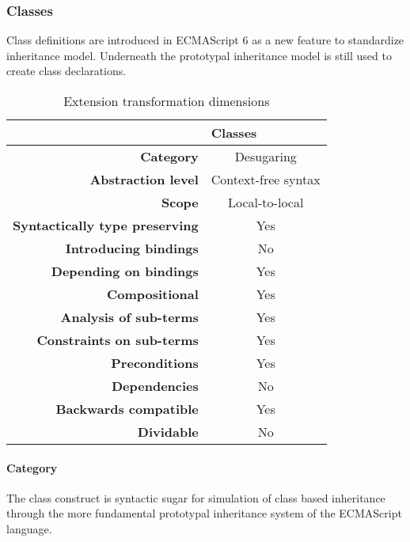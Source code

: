 \subsubsection{Classes}
Class definitions\cite[14.5]{SpecJS} are introduced in ECMAScript 6 as a new feature to standardize inheritance model. Underneath the prototypal inheritance model is still used to create class declarations.
\begin{table}[h]
\centering
\caption{Extension transformation dimensions}
\label{classes-table}
\begin{tabular}{@{}rc@{}}
\toprule
                                       & \multicolumn{1}{l}{\textbf{Classes}} \\ \midrule
\textbf{Category}                      & Desugaring
\\ 
\textbf{Abstraction level}          & Context-free syntax                          \\
\textbf{Scope}                         & Local-to-local                               \\
\textbf{Syntactically type preserving} & Yes                                          \\
\textbf{Introducing bindings}          & No                                          \\%
\textbf{Depending on bindings}         & Yes                                           \\
\textbf{Compositional}                 & Yes                                          \\
\textbf{Analysis of sub-terms}          & Yes                                          \\
\textbf{Constraints on sub-terms}       & Yes                                           \\
\textbf{Preconditions}                 & Yes                                          \\
\textbf{Dependencies}                  & No                                           \\
\textbf{Backwards compatible}          & Yes                                          \\
\textbf{Dividable}                     & No                                           \\ \bottomrule
\end{tabular}
\end{table}

\paragraph{Category}
The class construct is syntactic sugar for simulation of class based inheritance through the more fundamental prototypal inheritance system of the ECMAScript language.

